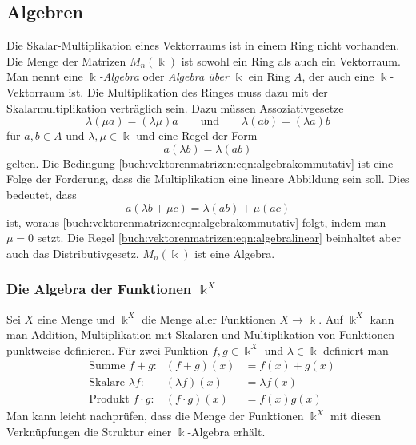 %
%
%
\subsection{Algebren
\label{buch:grundlagen:subsection:algebren}}
Die Skalar-Multiplikation eines Vektorraums ist in einem Ring nicht
vorhanden.
Die Menge der Matrizen $M_n(\Bbbk)$ ist sowohl ein Ring als auch
ein Vektorraum.
Man nennt eine {\em $\Bbbk$-Algebra} oder {\em Algebra über $\Bbbk$}
%
%
ein Ring $A$, der auch eine $\Bbbk$-Vektorraum ist.
Die Multiplikation des Ringes muss dazu mit der Skalarmultiplikation
verträglich sein.
Dazu müssen Assoziativgesetze
\[
\lambda(\mu a) = (\lambda \mu) a
\qquad\text{und}\qquad
\lambda(ab) = (\lambda a) b
\]
für $a,b\in A$ und $\lambda,\mu\in\Bbbk$
und eine Regel der Form
\begin{equation}
a(\lambda b) = \lambda (ab)
\label{buch:vektorenmatrizen:eqn:algebrakommutativ}
\end{equation}
gelten.
Die Bedingung \eqref{buch:vektorenmatrizen:eqn:algebrakommutativ} ist
eine Folge der Forderung, dass die Multiplikation 
eine lineare Abbildung sein soll.
Dies bedeutet, dass
\begin{equation}
a(\lambda b+\mu c) = \lambda (ab) + \mu (ac)
\label{buch:vektorenmatrizen:eqn:algebralinear}
\end{equation}
ist,
woraus 
\eqref{buch:vektorenmatrizen:eqn:algebrakommutativ}
folgt, indem man
$\mu=0$ setzt.
Die Regel \eqref{buch:vektorenmatrizen:eqn:algebralinear}
beinhaltet aber auch das Distributivgesetz.
$M_n(\Bbbk)$ ist eine Algebra.

\subsubsection{Die Algebra der Funktionen $\Bbbk^X$}
Sei $X$ eine Menge und $\Bbbk^X$ die Menge aller Funktionen $X\to \Bbbk$.
%
Auf $\Bbbk^X$ kann man Addition, Multiplikation mit Skalaren und
Multiplikation von Funktionen punktweise definieren.
Für zwei Funktion $f,g\in\Bbbk^X$ und $\lambda\in\Bbbk$ definiert man
\[
\begin{aligned}
&\text{Summe $f+g$:}
&
(f+g)(x) &= f(x)+g(x)
\\
&\text{Skalare $\lambda f$:}
&
(\lambda f)(x) &= \lambda f(x)
\\
&\text{Produkt $f\cdot g$:}
&
(f\cdot g)(x) &= f(x) g(x)
\end{aligned}
\]
Man kann leicht nachprüfen, dass die Menge der Funktionen $\Bbbk^X$
mit diesen Verknüpfungen die Struktur einer $\Bbbk$-Algebra erhält.


